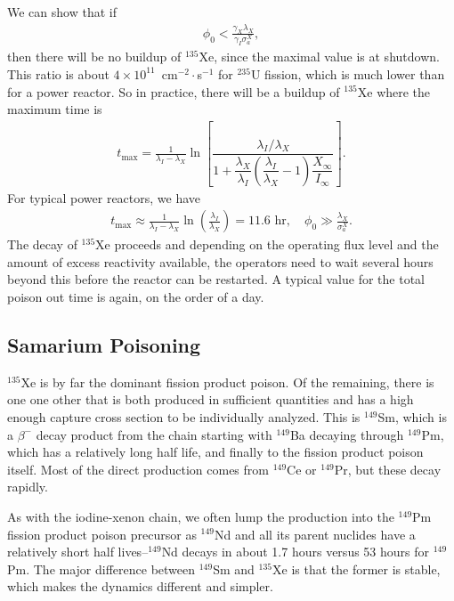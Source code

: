 We can show that if
\begin{align}
  \phi_0 < \frac{ \gamma_X \lambda_X }{ \gamma_I \sigma_a^X },
\end{align}
then there will be no buildup of $^{135}$Xe, since the maximal value is at shutdown. This ratio is about $4 \times 10^{11}$~cm$^{-2}\cdot$s$^{-1}$ for $^{235}$U fission, which is much lower than for a power reactor. So in practice, there will be a buildup of $^{135}$Xe where the maximum time is
\begin{align}
  t_\text{max} = \frac{1}{\lambda_I - \lambda_X} \ln \left[ \dfrac{ \lambda_I / \lambda_X }{ 1 + \dfrac{\lambda_X}{\lambda_I} \left( \dfrac{\lambda_I}{\lambda_X} - 1 \right) \dfrac{X_\infty}{I_\infty} } \right] .
\end{align}
For typical power reactors, we have
\begin{align}
  t_\text{max} \approx \frac{1}{\lambda_I - \lambda_X} \ln \left( \frac{\lambda_I}{\lambda_X} \right) = 11.6 \text{ hr}, \quad  \phi_0 \gg \frac{\lambda_X}{\sigma_a^X} .
\end{align}
The decay of $^{135}$Xe proceeds and depending on the operating flux level and the amount of excess reactivity available, the operators need to wait several hours beyond this before the reactor can be restarted. A typical value for the total poison out time is again, on the order of a day.

\subsection{Samarium Poisoning}

$^{135}$Xe is by far the dominant fission product poison. Of the remaining, there is one one other that is both produced in sufficient quantities and has a high enough capture cross section to be individually analyzed. This is $^{149}$Sm, which is a $\beta^-$ decay product from the chain starting with $^{149}$Ba decaying through $^{149}$Pm, which has a relatively long half life, and finally to the fission product poison itself. Most of the direct production comes from $^{149}$Ce or $^{149}$Pr, but these decay rapidly. 

As with the iodine-xenon chain, we often lump the production into the $^{149}$Pm fission product poison precursor as $^{149}$Nd and all its parent nuclides have a relatively short half lives--$^{149}$Nd decays in about 1.7 hours versus 53 hours for $^{149}$Pm. The major difference between $^{149}$Sm and $^{135}$Xe is that the former is stable, which makes the dynamics different and simpler.

